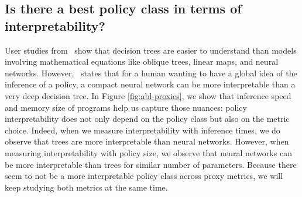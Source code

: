 \subsection{Is there a best policy class in terms of interpretability?}
User studies from~\cite{study-1,study-2,study-3} show that decision trees are easier to understand than models involving mathematical equations like oblique trees, linear maps, and neural networks. However,~\cite{mythos} states that for a human wanting to have a global idea of the inference of a policy, a compact neural network can be more interpretable than a very deep decision tree. In Figure \ref{fig:abl-proxies}, we show that inference speed and memory size of programs help us capture those nuances: policy interpretability does not only depend on the policy class but also on the metric choice. Indeed, when we measure interpretability with inference times, we do observe that trees are more interpretable than neural networks. However, when measuring interpretability with policy size, we observe that neural networks can be more interpretable than trees for similar number of parameters. Because there seem to not be a more interpretable policy class across proxy metrics, we will keep studying both metrics at the same time.
